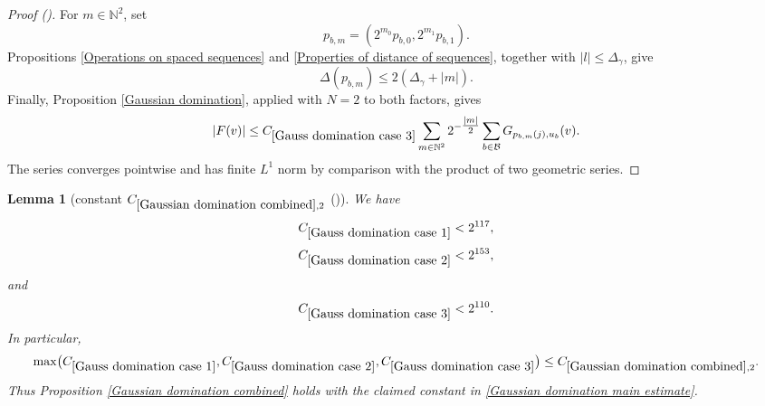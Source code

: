 \documentclass[12pt,reqno]{amsart}
\newcommand{\auto}{{({\tiny\faCar})}}
\theoremstyle{plain}
\newtheorem{lemma}[theorem]{Lemma}
\numberwithin{equation}{section}
\theoremstyle{remark}
\newcommand{\uses}[1]{}
\newcommand{\usesdefs}[1]{}
\newcommand{\N}{{\mathbb N}}
\begin{document}
\begin{proof}[Proof \auto]
For $m\in\N^2$, set
\[
p_{b,m}=(2^{m_0}p_{b,0},2^{m_1}p_{b,1}).
\]
Propositions \ref{Operations on spaced sequences} and
\ref{Properties of distance of sequences}, together with
$|l|\le\Delta_\gamma$, give
\[
\Delta(p_{b,m})
\le
2(\Delta_\gamma+|m|).
\]
Finally, Proposition \ref{Gaussian domination}, applied with $N=2$ to both factors, gives
\[
|F(v)|
\le
C_{\ref{Gauss domination case 3}}
\sum_{m\in\N^2}2^{-\tfrac{|m|}{2}}
\sum_{b\in\mathcal B}
G_{p_{b,m}(j),u_b}(v).
\]
The series converges pointwise and has finite $L^1$ norm by comparison with the product of two geometric series.

\medskip
\end{proof}

\begin{lemma}[constant $C_{\ref{Gaussian domination combined},2}$ \auto]\label{Gauss domination constant}\uses{standard bump properties,constant four scale Gaussian kernel,constant mean four scale Gaussian kernel,four scale Gaussian kernel,mean four scale Gaussian kernel,constant H kernel estimate Gaussian domination,constant H kernel derivative estimate Gaussian domination,H kernel estimate Gaussian domination,H kernel derivative estimate Gaussian domination,two bump estimate,bump triangle,Gauss domination case 1,Gauss domination case 2,Gauss domination case 3}\usesdefs{}
We have
\begin{equation}\label{auto:Gaussian-domination-case-constant-bounds}
C_{\ref{Gauss domination case 1}}<2^{117},
\end{equation}
\begin{equation}\label{auto:Gaussian-domination-case-two-constant-bound}
C_{\ref{Gauss domination case 2}}<2^{153},
\end{equation}
and
\begin{equation}\label{auto:Gaussian-domination-case-three-constant-bound}
C_{\ref{Gauss domination case 3}}<2^{110}.
\end{equation}
In particular,
\begin{equation}\label{auto:Gaussian-domination-common-constant-bound}
\max\bigl(C_{\ref{Gauss domination case 1}},C_{\ref{Gauss domination case 2}},C_{\ref{Gauss domination case 3}}\bigr)
\le C_{\ref{Gaussian domination combined},2}.
\end{equation}
Thus Proposition \ref{Gaussian domination combined} holds with the claimed constant in \eqref{Gaussian domination main estimate}.
\end{lemma}
\end{document}
